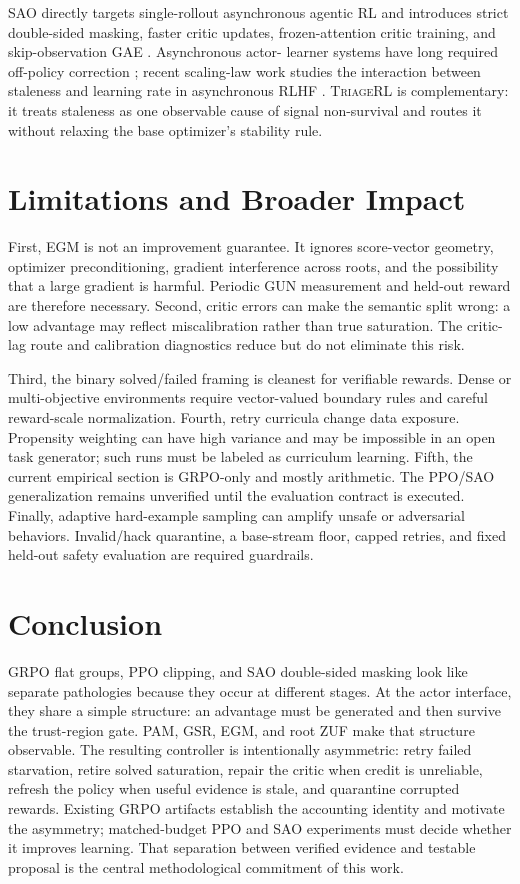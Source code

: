 \documentclass{article}
\newcommand{\method}{\textsc{TriageRL}\xspace}
\begin{document}
SAO directly targets single-rollout asynchronous agentic RL and introduces
strict double-sided masking, faster critic updates, frozen-attention critic
training, and skip-observation GAE \citep{hou2026sao}.  Asynchronous actor-
learner systems have long required off-policy correction
\citep{mnih2016asynchronous,espeholt2018impala}; recent scaling-law work studies
the interaction between staleness and learning rate in asynchronous RLHF
\citep{song2026staleness}.  \method is complementary: it treats staleness as
one observable cause of signal non-survival and routes it without relaxing the
base optimizer's stability rule.

\section{Limitations and Broader Impact}

First, EGM is not an improvement guarantee.  It ignores score-vector geometry,
optimizer preconditioning, gradient interference across roots, and the
possibility that a large gradient is harmful.  Periodic GUN measurement and
held-out reward are therefore necessary.  Second, critic errors can make the
semantic split wrong: a low advantage may reflect miscalibration rather than
true saturation.  The critic-lag route and calibration diagnostics reduce but
do not eliminate this risk.

Third, the binary solved/failed framing is cleanest for verifiable rewards.
Dense or multi-objective environments require vector-valued boundary rules and
careful reward-scale normalization.  Fourth, retry curricula change data
exposure.  Propensity weighting can have high variance and may be impossible
in an open task generator; such runs must be labeled as curriculum learning.
Fifth, the current empirical section is GRPO-only and mostly arithmetic.  The
PPO/SAO generalization remains unverified until the evaluation contract is
executed.  Finally, adaptive hard-example sampling can amplify unsafe or
adversarial behaviors.  Invalid/hack quarantine, a base-stream floor, capped
retries, and fixed held-out safety evaluation are required guardrails.

\section{Conclusion}

GRPO flat groups, PPO clipping, and SAO double-sided masking look like separate
pathologies because they occur at different stages.  At the actor interface,
they share a simple structure: an advantage must be generated and then survive
the trust-region gate.  PAM, GSR, EGM, and root ZUF make that structure
observable.  The resulting controller is intentionally asymmetric: retry
failed starvation, retire solved saturation, repair the critic when credit is
unreliable, refresh the policy when useful evidence is stale, and quarantine
corrupted rewards.  Existing GRPO artifacts establish the accounting identity
and motivate the asymmetry; matched-budget PPO and SAO experiments must decide
whether it improves learning.  That separation between verified evidence and
testable proposal is the central methodological commitment of this work.
\end{document}
